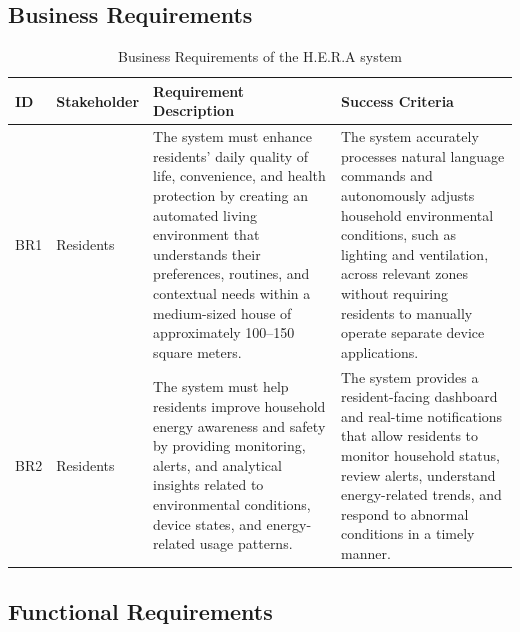 \subsection{Business Requirements}

\begin{table}[H]
	\centering
	\caption{Business Requirements of the H.E.R.A system}
	\label{tab:business_requirements}
	\renewcommand{\arraystretch}{1.2}
	\small
	
	\begin{tabularx}{\textwidth}{|>{\centering\arraybackslash}p{1.2cm}|p{2cm}|X|X|}
		\hline
		\textbf{ID} & \textbf{Stakeholder} & \textbf{Requirement Description} & \textbf{Success Criteria} \\
		\hline
		\hline
		BR1 & Residents & 
		The system must enhance residents' daily quality of life, convenience, and health protection by creating an automated living environment that understands their preferences, routines, and contextual needs within a medium-sized house of approximately 100--150 square meters. & 
		The system accurately processes natural language commands and autonomously adjusts household environmental conditions, such as lighting and ventilation, across relevant zones without requiring residents to manually operate separate device applications. \\
		\hline
		BR2 & Residents & 
		The system must help residents improve household energy awareness and safety by providing monitoring, alerts, and analytical insights related to environmental conditions, device states, and energy-related usage patterns. & 
		The system provides a resident-facing dashboard and real-time notifications that allow residents to monitor household status, review alerts, understand energy-related trends, and respond to abnormal conditions in a timely manner. \\
		\hline
	\end{tabularx}
\end{table}

\FloatBarrier

\subsection{Functional Requirements}

